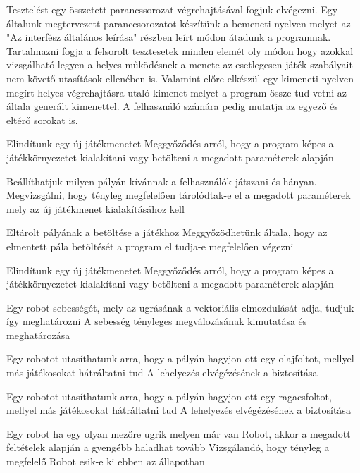 Tesztelést egy összetett parancssorozat végrehajtásával fogjuk elvégezni. Egy általunk megtervezett paranccsorozatot készítünk a bemeneti nyelven melyet az "Az interfész általános leírása" részben leírt módon átadunk a programnak. Tartalmazni fogja a felsorolt tesztesetek minden elemét oly módon hogy azokkal vizsgálható legyen a helyes működésnek a menete az esetlegesen játék szabályait nem követő utasítások ellenében is. Valamint előre elkészül egy kimeneti nyelven megírt helyes végrehajtásra utaló kimenet melyet a program össze tud vetni az általa generált kimenettel. A felhasználó számára pedig mutatja az egyező és eltérő sorokat is. 

%
{Elindítunk egy új játékmenetet}%
{Meggyőződés arról, hogy a program képes a játékkörnyezetet kialakítani vagy betölteni a megadott paraméterek alapján}

%
{Beállíthatjuk milyen pályán kívánnak a felhasználók játszani és hányan.}%
{Megvizsgálni, hogy tényleg megfelelően tárolódtak-e el a megadott paraméterek mely az új játékmenet kialakításához kell}

%
{Eltárolt pályának a betöltése a játékhoz}%
{Meggyőzödhetünk általa, hogy az elmentett pála betöltését a program el tudja-e megfelelően végezni}

%
{Elindítunk egy új játékmenetet}%
{Meggyőződés arról, hogy a program képes a játékkörnyezetet kialakítani vagy betölteni a megadott paraméterek alapján}

%
{Egy robot sebességét, mely az ugrásának a vektoriális elmozdulását adja, tudjuk így meghatározni}%
{A sebesség tényleges megválozásának kimutatása és meghatározása}

%
{Egy robotot utasíthatunk arra, hogy a pályán hagyjon ott egy olajfoltot, mellyel más játékosokat hátráltatni tud}%
{A lehelyezés elvégézésének a biztosítása}

%
{Egy robotot utasíthatunk arra, hogy a pályán hagyjon ott egy ragacsfoltot, mellyel más játékosokat hátráltatni tud}%
{A lehelyezés elvégézésének a biztosítása}

%
{Egy robot ha egy olyan mezőre ugrik melyen már van Robot, akkor a megadott feltételek alapján a gyengébb haladhat tovább}%
{Vizsgálandó, hogy tényleg a megfelelő Robot esik-e ki ebben az állapotban}

